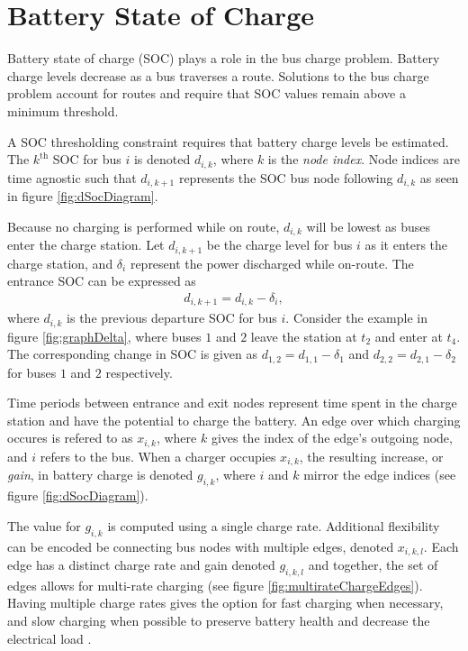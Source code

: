 \section{Battery State of Charge}
Battery state of charge (SOC) plays a role in the bus charge problem. Battery charge levels decrease as a bus traverses a route. Solutions to the bus charge problem account for routes and require that SOC values remain above a minimum threshold. 
\par A SOC thresholding constraint requires that battery charge levels be estimated. The $k^{\text{th}}$ SOC for bus $i$ is denoted $d_{i,k}$, where $k$ is the \textit{node index}. Node indices are time agnostic such that $d_{i,k+1}$ represents the SOC bus node following $d_{i,k}$ as seen in figure \ref{fig:dSocDiagram}. 
\par Because no charging is performed while on route, $d_{i,k}$ will be lowest as buses enter the charge station. Let $d_{i,k+1}$ be the charge level for bus $i$ as it enters the charge station, and $\delta_i$ represent the power discharged while on-route. The entrance SOC can be expressed as 
\begin{align}
	d_{i,k+1} = d_{i,k} - \delta_i,
\end{align}
where $d_{i,k}$ is the previous departure SOC for bus $i$. Consider the example in figure \ref{fig:graphDelta}, where buses $1$ and $2$ leave the station at $t_2$ and enter at $t_4$. The corresponding change in SOC is given as $d_{1,2} = d_{1,1} - \delta_1$ and $d_{2,2} = d_{2,1} - \delta_2$ for buses $1$ and $2$ respectively.

\par Time periods between entrance and exit nodes represent time spent in the charge station and have the potential to charge the battery. An edge over which charging occures is refered to as $x_{i,k}$, where $k$ gives the index of the edge's outgoing node, and $i$ refers to the bus.  When a charger occupies $x_{i,k}$, the resulting increase, or \textit{gain}, in battery charge is denoted $g_{i,k}$, where $i$ and $k$ mirror the edge indices (see figure \ref{fig:dSocDiagram}). 
\par The value for $g_{i,k}$ is computed using a single charge rate. Additional flexibility can be encoded be connecting bus nodes with multiple edges, denoted $x_{i,k,l}$. Each edge has a distinct charge rate and gain denoted $g_{i,k,l}$ and together, the set of edges allows for multi-rate charging (see figure \ref{fig:multirateChargeEdges}). Having multiple charge rates gives the option for fast charging when necessary, and slow charging when possible to preserve battery health and decrease the electrical load \cite{houbbadi_optimal_2019}.
